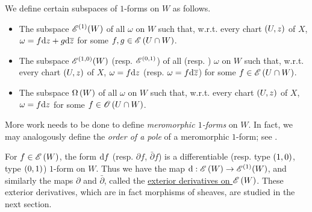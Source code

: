 \documentclass[../Moduli_Spaces_of_Riemann_Surfaces.tex]{subfiles}
\begin{document}
    \begin{definition}
        We define certain subspaces of $1$-forms on $W$ as follows.
        \begin{itemize}
            \item The subspace $\mathscr{E}^{\left(1\right)}\!\left(W\right)$ of all  $\omega$ on $W$ such that, w.r.t. every chart $\left(U,z\right)$ of $X$, $\omega=f\mathrm{d} z+g\mathrm{d}\overline{z}$ for some $f,g\in\mathscr{E}\left(U\cap W\right)$.
            \item The subspace $\mathscr{E}^{\left(1,0\right)}\!\left(W\right)$ (resp. $\mathscr{E}^{\left(0,1\right)}$) of all  (resp. )  $\omega$ on $W$ such that, w.r.t. every chart $\left(U,z\right)$ of $X$, $\omega=f\mathrm{d} z$ (resp. $\omega=f\mathrm{d}\overline{z}$) for some $f\in\mathscr{E}\left(U\cap W\right)$.
            \item The subspace $\Omega\left(W\right)$ of all  $\omega$ on $W$ such that, w.r.t. every chart $\left(U,z\right)$ of $X$, $\omega=f\mathrm{d} z$ for some $f\in\mathscr{O}\left(U\cap W\right)$.
        \end{itemize}
    \end{definition}
    \begin{remark}
        More work needs to be done to define \textit{meromorphic $1$-forms} on $W$. In fact, we may analogously define the \textit{order of a pole} of a meromorphic $1$-form; see \cite[][Section 9.9]{forster}.\exqed
    \end{remark}
    \begin{example}
        For $f\in\mathscr{E}\left(W\right)$, the form $\mathrm{d} f$ (resp. $\partial f$, $\bar{\partial}f$) is a differentiable (resp. type $\left(1,0\right)$, type $\left(0,1\right)$) $1$-form on $W$. Thus we have the map $\mathrm{d}:\mathscr{E}\left(W\right)\to\mathscr{E}^{\left(1\right)}\!\left(W\right)$, and similarly the maps $\partial$ and $\bar{\partial}$, called the \ul{exterior derivatives on $\mathscr{E}\left(W\right)$}. These exterior derivatives, which are in fact morphisms of sheaves, are studied in the next section.\exqed
    \end{example}
\end{document}
